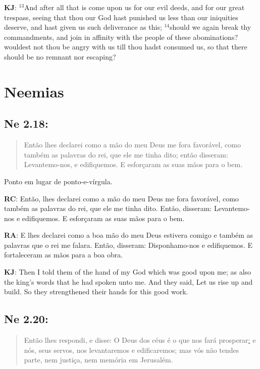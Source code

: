 \textbf{KJ}: $^{\mathrm{13}}$And after all that is come upon us for our evil
deeds, and for our great trespass, seeing that thou our God hast
punished us less than our iniquities deserve, and hast given us such
deliverance as this; $^{\mathrm{14}}$should we again break thy
commandments, and join in affinity with the people of these
abominations? wouldest not thou be angry with us till thou hadst
consumed us, so that there should be no remnant nor escaping?

\section{Neemias}
\subsection{Ne 2.18:}
\begin{quote}
    \small
Então lhes declarei como a mão do meu Deus me fora favorável, como também as palavras do rei, que ele me tinha dito\uline{;} então disseram: Levantemo-nos, e edifiquemos. E esforçaram as suas mãos para o bem.
\end{quote}

Ponto em lugar de ponto-e-vírgula.

\textbf{RC}: Então, lhes declarei como a mão do meu Deus me fora favorável, como também as palavras do rei, que ele me tinha dito. Então, disseram: Levantemo-nos e edifiquemos. E esforçaram as suas mãos para o bem.

\textbf{RA}: E lhes declarei como a boa mão do meu Deus estivera comigo e também as palavras que o rei me falara. Então, disseram: Disponhamo-nos e edifiquemos. E fortaleceram as mãos para a boa obra.

\textbf{KJ}: Then I told them of the hand of my God which was good upon me; as also the king’s words that he had spoken unto me. And they said, Let us rise up and build. So they strengthened their hands for this good work.

\subsection{Ne 2.20:}
\begin{quote}
    \small
Então lhes respondi, e disse: O Deus dos céus é o que nos fará prosperar\uline{:} e nós, seus servos, nos levantaremos e edificaremos; mas vós não tendes parte, nem justiça, nem memória em Jerusalém.
\end{quote}

